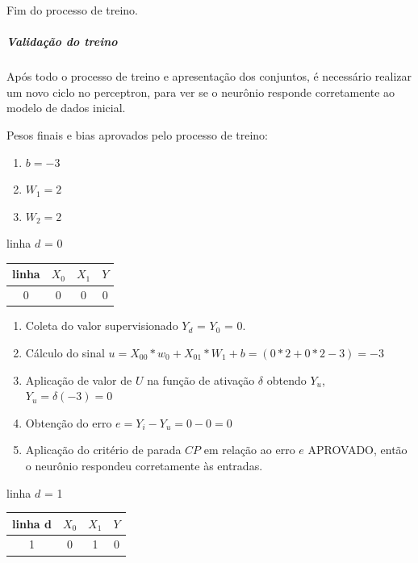 \documentclass[	12pt, Times, openright, twoside, a4paper, english, brazil]{abntex2}
\begin{document}
            	Fim do processo de treino.
            
            \subparagraph* {Validação do treino}
            	Após todo o processo de treino e apresentação dos conjuntos, é necessário realizar um novo ciclo no perceptron, para ver se o neurônio responde corretamente ao modelo de dados inicial.
            	
            	Pesos finais e bias aprovados pelo processo de treino:
            	\begin{enumerate}
            		\item $b=  -3$  					
            		\item $W_1= 2$ 
            		\item $W_2= 2$
            	\end{enumerate}
            	
                linha $d$ = 0\\
                    \begin{table}[!ht]
                    \centering
    				\begin{tabular}{|c|c|c|c|}
    					\hline  \textbf{linha} & \textbf{$X_0$} & \textbf{$X_1$} &  \textbf{$Y$}\\
  				 	    \hline 0 & 0 & 0 & 0\\ \hline
    				\end{tabular}
    				\end{table}
    				
            	\begin{enumerate}
            	    \item Coleta do valor supervisionado $Y_d$ = $Y_0$ = 0.
            		\item Cálculo do sinal $u = X_{00}*w_0 + X_{01}*W_1 +b = (0*2 + 0*2 -3) = -3$
            		\item Aplicação de valor de $U$ na função de ativação $\delta$ obtendo $Y_u$, $Y_u = \delta(-3) = 0$
            		\item Obtenção do erro $e = Y_i-Y_u = 0 - 0 = 0$
            		\item Aplicação do critério de parada $CP$ em relação ao erro $e$ APROVADO, então o neurônio respondeu corretamente às entradas.
            	\end{enumerate}
            	
                linha $d$ = 1\\
                    \begin{table}[!ht]
                    \centering
    				\begin{tabular}{|c|c|c|c|}
    					\hline  \textbf{linha d} & \textbf{$X_0$} & \textbf{$X_1$} &  \textbf{$Y$}\\
  				 	    \hline 1 & 0 & 1 & 0\\ \hline
    				\end{tabular}
    				\end{table}
    				
\end{document}
